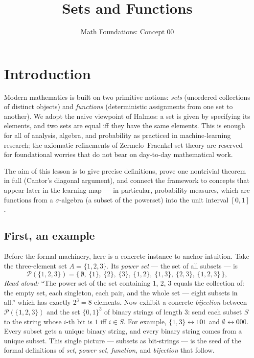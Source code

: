 \documentclass[11pt]{article}
\title{Sets and Functions}
\author{Math Foundations: Concept 00}
\date{}
\begin{document}
\maketitle

\section*{Introduction}

Modern mathematics is built on two primitive notions: \emph{sets} (unordered collections of distinct objects) and \emph{functions} (deterministic assignments from one set to another). We adopt the naive viewpoint of Halmos: a set is given by specifying its elements, and two sets are equal iff they have the same elements. This is enough for all of analysis, algebra, and probability as practiced in machine-learning research; the axiomatic refinements of Zermelo--Fraenkel set theory are reserved for foundational worries that do not bear on day-to-day mathematical work.

The aim of this lesson is to give precise definitions, prove one nontrivial theorem in full (Cantor's diagonal argument), and connect the framework to concepts that appear later in the learning map --- in particular, probability measures, which are functions from a $\sigma$-algebra (a subset of the powerset) into the unit interval $[0, 1]$.

\subsection*{First, an example}

Before the formal machinery, here is a concrete instance to anchor intuition. Take the three-element set $A = \{1, 2, 3\}$. Its \emph{power set} --- the set of all subsets --- is
\[
\mathcal{P}(\{1, 2, 3\}) = \bigl\{\, \emptyset,\ \{1\},\ \{2\},\ \{3\},\ \{1,2\},\ \{1,3\},\ \{2,3\},\ \{1,2,3\} \,\bigr\},
\]
\emph{Read aloud:} ``The power set of the set containing 1, 2, 3 equals the collection of: the empty set, each singleton, each pair, and the whole set --- eight subsets in all.''
which has exactly $2^3 = 8$ elements. Now exhibit a concrete \emph{bijection} between $\mathcal{P}(\{1,2,3\})$ and the set $\{0,1\}^3$ of binary strings of length $3$: send each subset $S$ to the string whose $i$-th bit is $1$ iff $i \in S$. For example, $\{1,3\} \leftrightarrow 101$ and $\emptyset \leftrightarrow 000$. Every subset gets a unique binary string, and every binary string comes from a unique subset. This single picture --- subsets as bit-strings --- is the seed of the formal definitions of \emph{set}, \emph{power set}, \emph{function}, and \emph{bijection} that follow.
\end{document}
